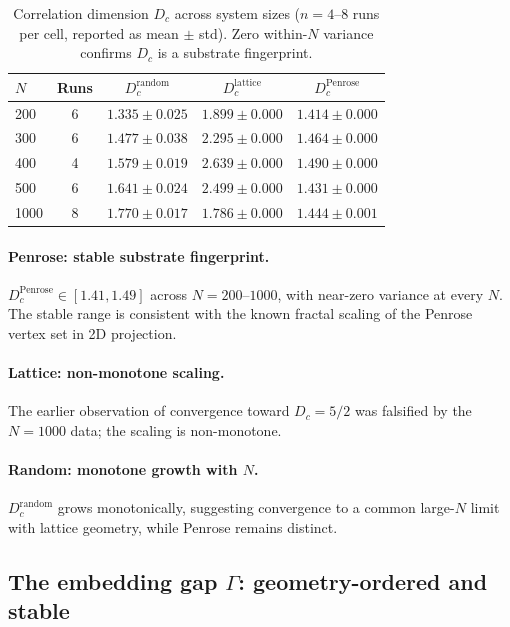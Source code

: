 \documentclass[12pt,a4paper]{article}
\theoremstyle{plain}
\theoremstyle{definition}
\begin{document}
\begin{table}[H]
\centering
\caption{Correlation dimension $D_c$ across system sizes ($n = 4$--$8$
  runs per cell, reported as mean $\pm$ std). Zero within-$N$ variance
  confirms $D_c$ is a substrate fingerprint.}
\label{tab:dc_scaling}
\begin{tabular}{lcccc}
\toprule
$N$ & Runs & $D_c^{\text{random}}$ & $D_c^{\text{lattice}}$ &
  $D_c^{\text{Penrose}}$ \\
\midrule
200  & 6 & $1.335 \pm 0.025$ & $1.899 \pm 0.000$ & $1.414 \pm 0.000$ \\
300  & 6 & $1.477 \pm 0.038$ & $2.295 \pm 0.000$ & $1.464 \pm 0.000$ \\
400  & 4 & $1.579 \pm 0.019$ & $2.639 \pm 0.000$ & $1.490 \pm 0.000$ \\
500  & 6 & $1.641 \pm 0.024$ & $2.499 \pm 0.000$ & $1.431 \pm 0.000$ \\
1000 & 8 & $1.770 \pm 0.017$ & $1.786 \pm 0.000$ & $1.444 \pm 0.001$ \\
\bottomrule
\end{tabular}
\end{table}

\paragraph{Penrose: stable substrate fingerprint.}
$D_c^{\text{Penrose}} \in [1.41, 1.49]$ across $N = 200$--$1000$, with
near-zero variance at every $N$. The stable range is consistent with the
known fractal scaling of the Penrose vertex set in 2D projection.

\paragraph{Lattice: non-monotone scaling.}
The earlier observation of convergence toward $D_c = 5/2$ was falsified
by the $N = 1000$ data; the scaling is non-monotone.

\paragraph{Random: monotone growth with $N$.}
$D_c^{\text{random}}$ grows monotonically, suggesting convergence to a
common large-$N$ limit with lattice geometry, while Penrose remains
distinct.

\subsection{The embedding gap $\Gamma$: geometry-ordered and stable}
\end{document}
